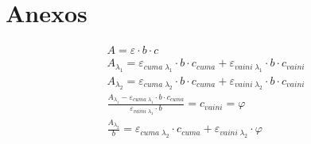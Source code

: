 \documentclass[11pt,fleqn]{article} %
\begin{document}
	\newpage %
	\section*{Anexos} %
		
	\begin{multicols}{2}
		
		\begin{gather}
			A=\varepsilon \cdot b \cdot c \\
			A_{\lambda_1}=\varepsilon _{cuma \; \lambda_1} \cdot b \cdot c _{cuma} + \varepsilon _{vaini \; \lambda_1} \cdot b \cdot c _{vaini} \\
			A_{\lambda_2}=\varepsilon _{cuma \; \lambda_2} \cdot b \cdot c _{cuma} + \varepsilon _{vaini \; \lambda_2} \cdot b \cdot c _{vaini} \\
			\frac{A_{\lambda_1} - \varepsilon _{cuma \; \lambda_1} \cdot b \cdot c _{cuma}}{\varepsilon _{vaini \; \lambda_1} \cdot b} =  c _{vaini} = \varphi  \\
			\frac{A_{\lambda_2}}{b}= \varepsilon _{cuma \; \lambda_2} \cdot c _{cuma} + \varepsilon _{vaini \; \lambda_2} \cdot \varphi
		\end{gather}
		
	\end{multicols}	
	
\end{document}
